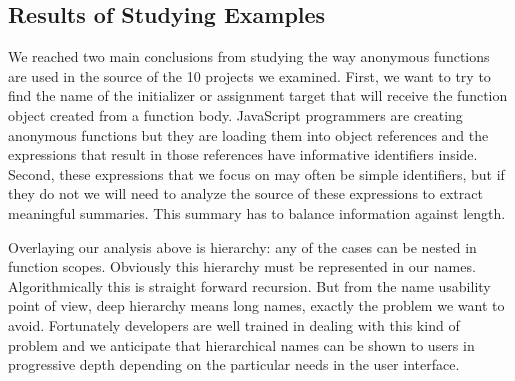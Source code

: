 \documentclass[10pt, preprint]{sigplanconf}
\begin{document}
\subsection{Results of Studying Examples}
We reached two main conclusions from studying the way anonymous functions are used in the source of the 10 projects we examined. First, we want to try to find the name of the initializer or assignment target that will receive the function object created from a function body.  JavaScript programmers are creating anonymous functions but they are loading them into object references and the expressions that result in those references have informative identifiers inside. Second, these expressions that we focus on may often be simple identifiers, but if they do not we will need to analyze the source of these expressions to extract meaningful summaries. This summary has to balance information against length.

Overlaying our analysis above is hierarchy: any of the cases can be nested in function scopes. Obviously this hierarchy must be represented in our names. Algorithmically this is straight forward recursion. But from the name usability point of view, deep hierarchy means long names, exactly the problem we want to avoid. Fortunately developers are well trained in dealing with this kind of problem and we anticipate that hierarchical names can be shown to users in progressive depth depending on the particular needs in the user interface.


\end{document}

